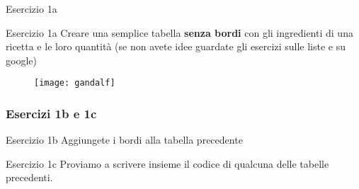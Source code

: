 \begin{frame}[fragile]{Esercizio 1a}

\begin{block}{Esercizio 1a}
	Creare una semplice tabella \textbf{senza bordi} con gli ingredienti di una ricetta
	e le loro quantità (se non avete idee guardate gli esercizi sulle liste e su google)
\end{block}

 \begin{figure}[H]
  \centering
  \texttt{[image: gandalf]}
 \end{figure}

\end{frame}

\begin{frame}
 
\frametitle{Esercizi 1b e 1c}

\begin{block}{Esercizio 1b}
	Aggiungete i bordi alla tabella precedente
\end{block}

\begin{block}{Esercizio 1c}
	Proviamo a scrivere insieme il codice di qualcuna delle tabelle precedenti.
\end{block}

\end{frame}

